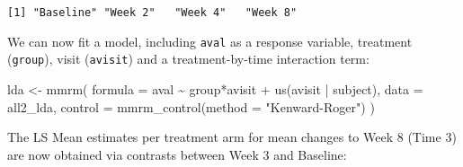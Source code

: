 \documentclass[
  letterpaper,
  DIV=11,
  numbers=noendperiod]{scrreprt}
\newenvironment{Shaded}{\begin{snugshade}}{\end{snugshade}}
\newcommand{\AttributeTok}[1]{\textcolor[rgb]{0.40,0.45,0.13}{#1}}
\newcommand{\DecValTok}[1]{\textcolor[rgb]{0.68,0.00,0.00}{#1}}
\newcommand{\DocumentationTok}[1]{\textcolor[rgb]{0.37,0.37,0.37}{\textit{#1}}}
\newcommand{\FunctionTok}[1]{\textcolor[rgb]{0.28,0.35,0.67}{#1}}
\newcommand{\NormalTok}[1]{\textcolor[rgb]{0.00,0.23,0.31}{#1}}
\newcommand{\OtherTok}[1]{\textcolor[rgb]{0.00,0.23,0.31}{#1}}
\newcommand{\SpecialCharTok}[1]{\textcolor[rgb]{0.37,0.37,0.37}{#1}}
\newcommand{\StringTok}[1]{\textcolor[rgb]{0.13,0.47,0.30}{#1}}
\begin{document}
\begin{Shaded}
\end{Shaded}

\begin{verbatim}
[1] "Baseline" "Week 2"   "Week 4"   "Week 8"  
\end{verbatim}

We can now fit a model, including \texttt{aval} as a response variable,
treatment (\texttt{group}), visit (\texttt{avisit}) and a
treatment-by-time interaction term:

\begin{Shaded}
\begin{Highlighting}[]
\NormalTok{lda }\OtherTok{\textless{}{-}} \FunctionTok{mmrm}\NormalTok{(}
  \AttributeTok{formula =}\NormalTok{ aval }\SpecialCharTok{\textasciitilde{}}\NormalTok{ group}\SpecialCharTok{*}\NormalTok{avisit }\SpecialCharTok{+} \FunctionTok{us}\NormalTok{(avisit }\SpecialCharTok{|}\NormalTok{ subject),}
  \AttributeTok{data =}\NormalTok{ all2\_lda,}
  \AttributeTok{control =} \FunctionTok{mmrm\_control}\NormalTok{(}\AttributeTok{method =} \StringTok{"Kenward{-}Roger"}\NormalTok{)}
\NormalTok{)}
\end{Highlighting}
\end{Shaded}

The LS Mean estimates per treatment arm for mean changes to Week 8 (Time
3) are now obtained via contrasts between Week 3 and Baseline:
\end{document}
